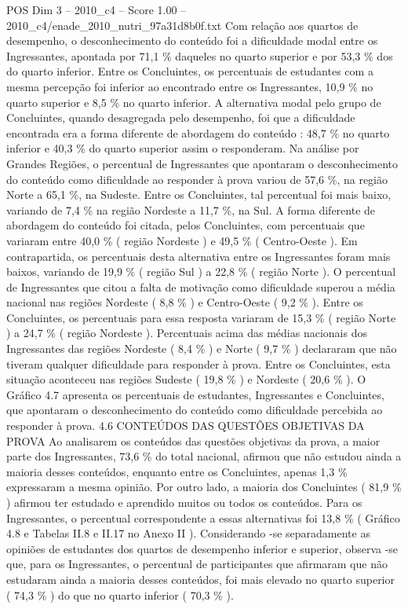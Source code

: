 \begin{textsample}{POS Dim 3 – 2010\_c4 – Score 1.00 – 2010\_c4/enade\_2010\_nutri\_97a31d8b0f.txt}
Com relação aos quartos de desempenho, o desconhecimento do conteúdo foi a dificuldade modal entre os Ingressantes, apontada por 71,1 \% daqueles no quarto superior e por 53,3 \% dos do quarto inferior.
Entre os Concluintes, os percentuais de estudantes com a mesma percepção foi inferior ao encontrado entre os Ingressantes, 10,9 \% no quarto superior e 8,5 \% no quarto inferior.
A alternativa modal pelo grupo de Concluintes, quando desagregada pelo desempenho, foi que a dificuldade encontrada era a forma diferente de abordagem do conteúdo : 48,7 \% no quarto inferior e 40,3 \% do quarto superior assim o responderam.
Na análise por Grandes Regiões, o percentual de Ingressantes que apontaram o desconhecimento do conteúdo como dificuldade ao responder à prova variou de 57,6 \%, na região Norte a 65,1 \%, na Sudeste.
Entre os Concluintes, tal percentual foi mais baixo, variando de 7,4 \% na região Nordeste a 11,7 \%, na Sul.
A forma diferente de abordagem do conteúdo foi citada, pelos Concluintes, com percentuais que variaram entre 40,0 \% ( região Nordeste ) e 49,5 \% ( Centro-Oeste ).
Em contrapartida, os percentuais desta alternativa entre os Ingressantes foram mais baixos, variando de 19,9 \% ( região Sul ) a 22,8 \% ( região Norte ).
O percentual de Ingressantes que citou a falta de motivação como dificuldade superou a média nacional nas regiões Nordeste ( 8,8 \% ) e Centro-Oeste ( 9,2 \% ).
Entre os Concluintes, os percentuais para essa resposta variaram de 15,3 \% ( região Norte ) a 24,7 \% ( região Nordeste ).
Percentuais acima das médias nacionais dos Ingressantes das regiões Nordeste ( 8,4 \% ) e Norte ( 9,7 \% ) declararam que não tiveram qualquer dificuldade para responder à prova.
Entre os Concluintes, esta situação aconteceu nas regiões Sudeste ( 19,8 \% ) e Nordeste ( 20,6 \% ).
O Gráfico 4.7 apresenta os percentuais de estudantes, Ingressantes e Concluintes, que apontaram o desconhecimento do conteúdo como dificuldade percebida ao responder à prova. 4.6 CONTEÚDOS DAS QUESTÕES OBJETIVAS DA PROVA Ao analisarem os conteúdos das questões objetivas da prova, a maior parte dos Ingressantes, 73,6 \% do total nacional, afirmou que não estudou ainda a maioria desses conteúdos, enquanto entre os Concluintes, apenas 1,3 \% expressaram a mesma opinião.
Por outro lado, a maioria dos Concluintes ( 81,9 \% ) afirmou ter estudado e aprendido muitos ou todos os conteúdos.
Para os Ingressantes, o percentual correspondente a essas alternativas foi 13,8 \% ( Gráfico 4.8 e Tabelas II.8 e II.17 no Anexo II ).
Considerando -se separadamente as opiniões de estudantes dos quartos de desempenho inferior e superior, observa -se que, para os Ingressantes, o percentual de participantes que afirmaram que não estudaram ainda a maioria desses conteúdos, foi mais elevado no quarto superior ( 74,3 \% ) do que no quarto inferior ( 70,3 \% ).

\end{textsample}
